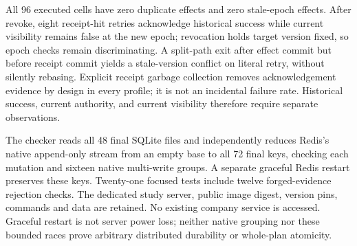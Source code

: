 All 96 executed cells have zero duplicate effects and zero stale-epoch effects. After revoke, eight receipt-hit retries acknowledge historical success while current visibility remains false at the new epoch; revocation holds target version fixed, so epoch checks remain discriminating. A split-path exit after effect commit but before receipt commit yields a stale-version conflict on literal retry, without silently rebasing. Explicit receipt garbage collection removes acknowledgement evidence by design in every profile; it is not an incidental failure rate. Historical success, current authority, and current visibility therefore require separate observations.

The checker reads all 48 final SQLite files and independently reduces Redis's native append-only stream from an empty base to all 72 final keys, checking each mutation and sixteen native multi-write groups. A separate graceful Redis restart preserves these keys. Twenty-one focused tests include twelve forged-evidence rejection checks. The dedicated study server, public image digest, version pins, commands and data are retained. No existing company service is accessed. Graceful restart is not server power loss; neither native grouping nor these bounded races prove arbitrary distributed durability or whole-plan atomicity.
